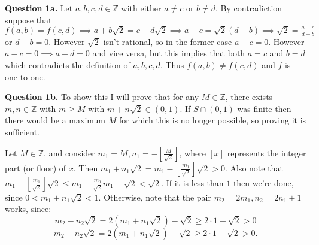 \documentclass[letterpaper, reqno,11pt]{article}
\begin{document}
\title{}
\date{29/09/23}
\author{Xander Naumenko}
\maketitle

{\medskip\noindent\bf Question 1a.} Let $a,b,c,d\in \mathbb{Z}$ with either $a\neq c$ or $b\neq d$. By contradiction suppose that $f(a,b)=f(c,d)\implies a+b\sqrt{2}=c+d\sqrt{2}\implies a-c=\sqrt{2}\left( d-b \right) \implies \sqrt{2}=\frac{a-c}{d-b}$ or $d-b=0$. However $\sqrt{2}$ isn't rational, so in the former case $a-c=0$. However $a-c=0 \implies a-d=0$ and vice versa, but this implies that both $a=c$ and $b=d$ which contradicts the definition of $a,b,c,d$. Thus $f(a,b)\neq f(c,d)$ and $f$ is one-to-one.

{\medskip\noindent\bf Question 1b.} To show this I will prove that for any $M\in \mathbb{Z}$, there exists $m,n\in \mathbb{Z}$ with $m\geq M$ with $m+n\sqrt{2}\in (0,1)$. If $S\cap(0,1)$ was finite then there would be a maximum $M$ for which this is no longer possible, so proving it is sufficient.

Let $M\in\mathbb{Z}$, and consider $m_1=M,n_1=-\left[\frac{M}{\sqrt{2}}\right]$, where $[x]$ represents the integer part (or floor) of $x$. Then $m_1+n_1\sqrt{2}=m_1-\left[\frac{m_1}{\sqrt{2}}\right]\sqrt{2}> 0$. Also note that $m_1-\left[\frac{m_1}{\sqrt{2}}\right]\sqrt{2}\leq m_1-\frac{m_1}{\sqrt{2}}m_1+\sqrt{2}<\sqrt{2}$. If it is less than $1$ then we're done, since $0<m_1+n_1\sqrt{2}<1$. Otherwise, note that the pair $m_2=2m_1,n_2=2n_1+1$ works, since:
\[
m_2-n_2\sqrt{2}=2\left( m_1+n_1\sqrt{2} \right) -\sqrt{2}\geq 2\cdot 1-\sqrt{2}>0
\]
\[
m_2-n_2\sqrt{2}=2\left( m_1+n_1\sqrt{2} \right) -\sqrt{2}\geq 2\cdot 1-\sqrt{2}>0
.\]
\end{document}
